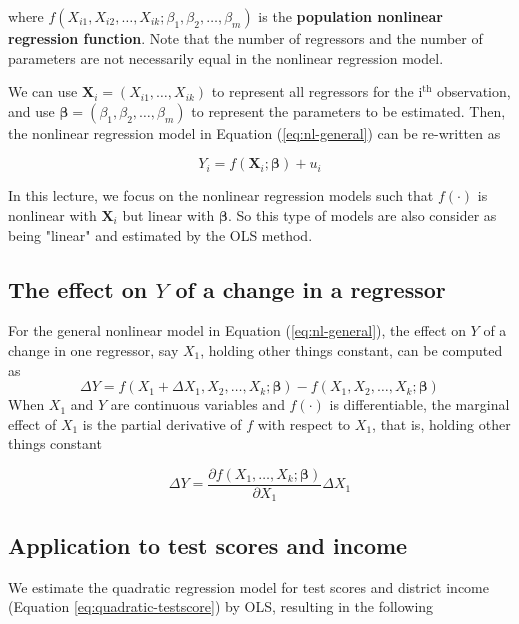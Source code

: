 \documentclass[a4paper,11pt]{article}
\begin{document}
where \(f(X_{i1}, X_{i2}, \ldots, X_{ik}; \beta_1, \beta_2, \ldots,
\beta_m)\) is the \textbf{population nonlinear regression function}. Note that
the number of regressors and the number of parameters are not
necessarily equal in the nonlinear regression model.

We can use \(\mathbf{X}_i = (X_{i1}, \ldots, X_{ik})\) to represent all
regressors for the i\(^{\text{th}}\) observation, and use
\(\boldsymbol{\beta}=(\beta_1, \beta_2, \ldots, \beta_m)\) to represent
the parameters to be estimated. Then, the nonlinear regression model
in Equation (\ref{eq:nl-general}) can be re-written as

\begin{equation}
\label{eq:nl-general-mat}
Y_i = f(\mathbf{X}_i; \boldsymbol{\beta}) + u_i
\end{equation}

In this lecture, we focus on the nonlinear regression models
such that \(f(\cdot)\) is nonlinear with \(\mathbf{X}_i\) but linear with
\(\boldsymbol{\beta}\). So this type of models are also consider as
being "linear" and estimated by the OLS method.


\subsection{The effect on \(Y\) of a change in a regressor}
\label{sec:orga1190ca}

For the general nonlinear model in Equation (\ref{eq:nl-general}), the
effect on \(Y\) of a change in one regressor, say \(X_1\), holding other
things constant, can be computed as
\begin{equation}
\label{eq:nl-gen-effect}
\Delta Y = f(X_1 + \Delta X_1, X_2, \ldots, X_k; \boldsymbol{\beta}) - f(X_1, X_2, \ldots, X_k; \boldsymbol{\beta})
\end{equation}
When \(X_1\) and \(Y\) are continuous variables and \(f(\cdot)\) is
differentiable, the marginal effect of \(X_1\) is the partial derivative
of \(f\) with respect to \(X_1\), that is, holding other things constant

\[ \Delta Y = \frac{\partial f(X_1, \ldots, X_k; \boldsymbol{\beta})}{\partial X_1} \Delta X_1  \]


\subsection{Application to test scores and income}
\label{sec:orgae6b48d}

We estimate the quadratic regression model for test scores and
district income (Equation \ref{eq:quadratic-testscore}) by OLS,
resulting in the following
\end{document}
